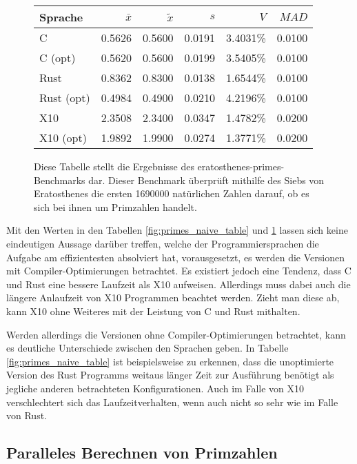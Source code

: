 \begin{figure}[hb]
	\begin{center}
		\begin{tabular}{lrrrrr}
			\toprule
			Sprache    & $\bar{x}$ & $\tilde{x}$ & $s$ & $V$ & $MAD$ \\
			\midrule
			C          & 0.5626 & 0.5600 & 0.0191 & 3.4031\% & 0.0100 \\
			C (opt)    & 0.5620 & 0.5600 & 0.0199 & 3.5405\% & 0.0100 \\
			Rust       & 0.8362 & 0.8300 & 0.0138 & 1.6544\% & 0.0100 \\
			Rust (opt) & 0.4984 & 0.4900 & 0.0210 & 4.2196\% & 0.0100 \\
			X10        & 2.3508 & 2.3400 & 0.0347 & 1.4782\% & 0.0200 \\
			X10 (opt)  & 1.9892 & 1.9900 & 0.0274 & 1.3771\% & 0.0200 \\
			\bottomrule
		\end{tabular}
	\end{center}
	\caption{
		Diese Tabelle stellt die Ergebnisse des eratosthenes-primes-Benchmarks dar.
		Dieser Benchmark überprüft mithilfe des Siebs von Eratosthenes die ersten 1690000 natürlichen Zahlen darauf,
		ob es sich bei ihnen um Primzahlen handelt.
	}
	\label{fig:primes_eratosthenes_table}
\end{figure}

Mit den Werten in den Tabellen \ref{fig:primes_naive_table} und \ref{fig:primes_eratosthenes_table} lassen sich keine
eindeutigen Aussage darüber treffen, welche der Programmiersprachen die Aufgabe am effizientesten
absolviert hat, vorausgesetzt, es werden die Versionen mit Compiler-Optimierungen betrachtet. Es existiert
jedoch eine Tendenz, dass C und Rust eine bessere Laufzeit als X10 aufweisen.
Allerdings muss dabei auch die längere Anlaufzeit von X10 Programmen beachtet werden.
Zieht man diese ab, kann X10 ohne Weiteres mit der Leistung von C und Rust mithalten.

Werden allerdings die Versionen ohne Compiler-Optimierungen betrachtet, kann es deutliche Unterschiede zwischen den
Sprachen geben. In Tabelle \ref{fig:primes_naive_table} ist beispielsweise zu erkennen, dass die unoptimierte
Version des Rust Programms weitaus länger Zeit zur Ausführung benötigt als jegliche anderen betrachteten
Konfigurationen. Auch im Falle von X10 verschlechtert sich das Laufzeitverhalten, wenn auch nicht so
sehr wie im Falle von Rust.

\subsection{Paralleles Berechnen von Primzahlen}

